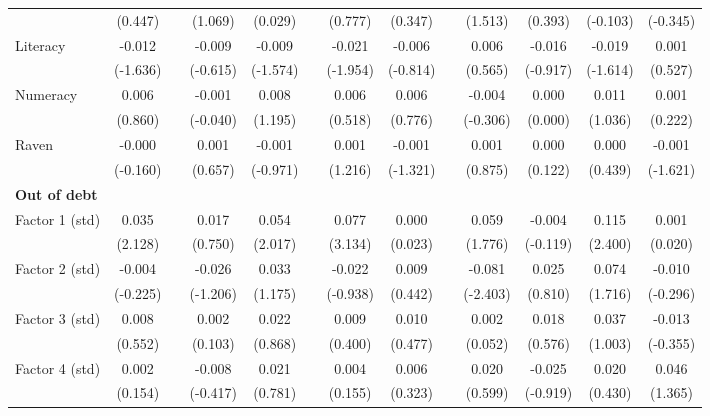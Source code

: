 \begin{table}[htbp]
{\begin{tabular}{lcccccccccccc}
          & (0.447) &       & (1.069) & (0.029) &       & (0.777) & (0.347) &       & (1.513) & (0.393) & (-0.103) & (-0.345) \\
    Literacy & -0.012 &       & -0.009 & -0.009 &       & -0.021 & -0.006 &       & 0.006 & -0.016 & -0.019 & 0.001 \\
          & (-1.636) &       & (-0.615) & (-1.574) &       & (-1.954) & (-0.814) &       & (0.565) & (-0.917) & (-1.614) & (0.527) \\
    Numeracy & 0.006 &       & -0.001 & 0.008 &       & 0.006 & 0.006 &       & -0.004 & 0.000 & 0.011 & 0.001 \\
          & (0.860) &       & (-0.040) & (1.195) &       & (0.518) & (0.776) &       & (-0.306) & (0.000) & (1.036) & (0.222) \\
    Raven & -0.000 &       & 0.001 & -0.001 &       & 0.001 & -0.001 &       & 0.001 & 0.000 & 0.000 & -0.001 \\
          & (-0.160) &       & (0.657) & (-0.971) &       & (1.216) & (-1.321) &       & (0.875) & (0.122) & (0.439) & (-1.621) \\
    \midrule
    \textbf{Out of debt} &       &       &       &       &       &       &       &       &       &       &       &  \\
    Factor 1 (std) & 0.035 &       & 0.017 & 0.054 &       & 0.077 & 0.000 &       & 0.059 & -0.004 & 0.115 & 0.001 \\
          & (2.128) &       & (0.750) & (2.017) &       & (3.134) & (0.023) &       & (1.776) & (-0.119) & (2.400) & (0.020) \\
    Factor 2 (std) & -0.004 &       & -0.026 & 0.033 &       & -0.022 & 0.009 &       & -0.081 & 0.025 & 0.074 & -0.010 \\
          & (-0.225) &       & (-1.206) & (1.175) &       & (-0.938) & (0.442) &       & (-2.403) & (0.810) & (1.716) & (-0.296) \\
    Factor 3 (std) & 0.008 &       & 0.002 & 0.022 &       & 0.009 & 0.010 &       & 0.002 & 0.018 & 0.037 & -0.013 \\
          & (0.552) &       & (0.103) & (0.868) &       & (0.400) & (0.477) &       & (0.052) & (0.576) & (1.003) & (-0.355) \\
    Factor 4 (std) & 0.002 &       & -0.008 & 0.021 &       & 0.004 & 0.006 &       & 0.020 & -0.025 & 0.020 & 0.046 \\
          & (0.154) &       & (-0.417) & (0.781) &       & (0.155) & (0.323) &       & (0.599) & (-0.919) & (0.430) & (1.365) \\

\end{tabular}}
\end{table}

